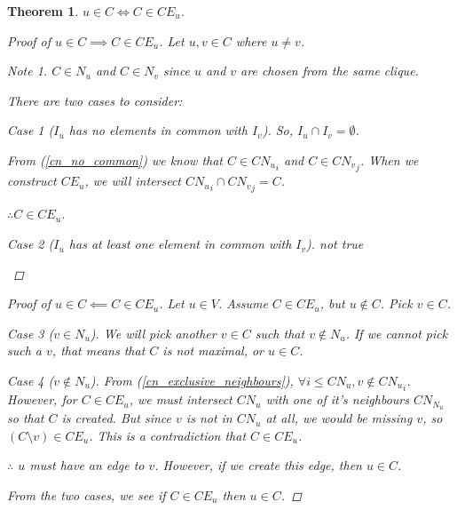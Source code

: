 \documentclass{article}
\theoremstyle{plain}
\newtheorem{thm}{Theorem}[section]
\theoremstyle{definition}
\theoremstyle{remark}
\newtheorem*{note}{Note}
\newtheorem*{case}{Case}
\newcommand{\cn}[1]{ {{CN}_{#1}} }
\newcommand{\ce}[1]{ {{CE}_{#1}} }
\newcommand{\ignv}[1]{ {I_{#1}} }
\newcommand{\nev}[1]{ {N_{#1}} }
\begin{document}
\begin{thm}
    \(u \in C \iff C \in \ce{u}\).

    \begin{proof}[Proof of \(u \in C \implies C \in \ce{u}\)]
        Let \(u, v \in C\) where \(u \neq v\).
        \begin{note}
            \(C \in \nev{u}\) and \(C \in \nev{v}\) since \(u\) and \(v\) are chosen from
            the same clique.
        \end{note}
        There are two cases to consider:
        \begin{case}[\(\ignv{u}\) has no elements in common with \(\ignv{v}\)]
            So, \(\ignv{u} \cap \ignv{v} = \emptyset\).

            From (\ref{cn_no_common})
            we know that \(C \in \cn{u}_i\) and \(C \in \cn{v}_j\). When we construct
            \(\ce{u}\), we will intersect \(\cn{u}_i \cap \cn{v}_j = C\).

            \(\therefore C \in \ce{u}\).
        \end{case}
        \begin{case}[\(\ignv{u}\) has at least one element in common with \(\ignv{v}\)]
            not true
        \end{case}
    \end{proof}

    \begin{proof}[Proof of \(u \in C \impliedby C \in \ce{u}\)]
        Let \(u \in V\). Assume \(C \in \ce{u}\), but \(u \not\in C\). Pick \(v \in C\).

        \begin{case}[\(v \in \nev{u}\)]
            We will pick another \(v \in C\) such that \(v \not\in \nev{u}\). If we cannot
            pick such a \(v\), that means that \(C\) is not maximal, or \(u \in C\).
        \end{case}
        \begin{case}[\(v \not\in \nev{u}\)]
            From (\ref{cn_exclusive_neighbours}),
            \(\forall i \leq \cn{u}, v \not\in \cn{u}_i\). However, for \(C \in \ce{u}\),
            we must intersect \(\cn{u}\) with one of it's neighbours \(\cn{\nev{u}}\) so
            that \(C\) is created. But since \(v\) is not in \(\cn{u}\) at all, we would
            be missing \(v\), so \((C \setminus v) \in \ce{u}\). This is a contradiction
            that \(C \in \ce{u}\).

            \(\therefore\) \(u\) must have an edge to \(v\). However, if we create this
            edge, then \(u \in C\).
        \end{case}
        From the two cases, we see if \(C \in \ce{u}\) then \(u \in C\).
    \end{proof}
    \label{c_in_ce}
\end{thm}
\end{document}
